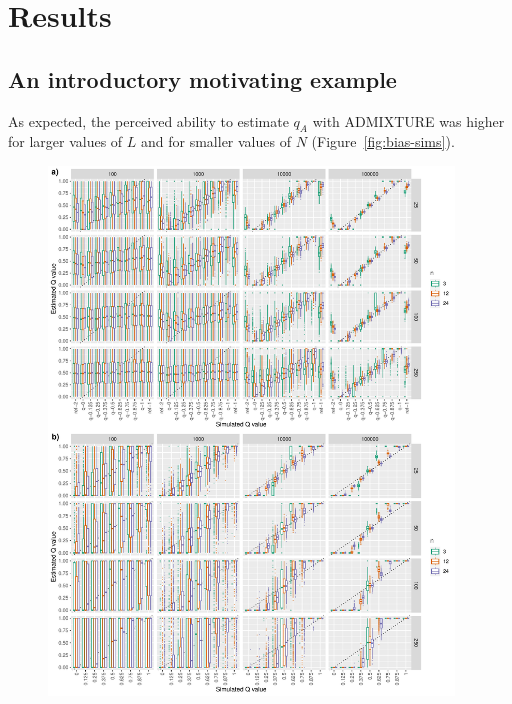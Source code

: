 {\section*{Results}

\subsection*{An introductory motivating example}

As expected, the perceived ability to estimate $q_A$ with ADMIXTURE was higher
for larger values of $L$ and for smaller values of $N$ (Figure~\ref{fig:bias-sims}).
\begin{figure}
\newcommand{\biassimscap}{\footnotesize ADMIXTURE estimates of $q_A$ as described in
{\em An introductory motivating example}. In these results, the apparent ability to estimate $q_A$
is a bias resulting from the use of sampling with replacement to simulate new, admixed genotypes to
test in ADMIXTURE.  In each figure, the different columns represent different numbers of markers
from 10 to 100,000, while different rows represent different original sample sizes, $N$, taken. Colors
of the boxplots indicate how many new individuals, $n$, of each $q_A$ value were simulated during each
replicate.}
\includegraphics[width=0.96\textwidth]{figures/bias-sims-unsup-and-sup.pdf}

\end{figure}}
